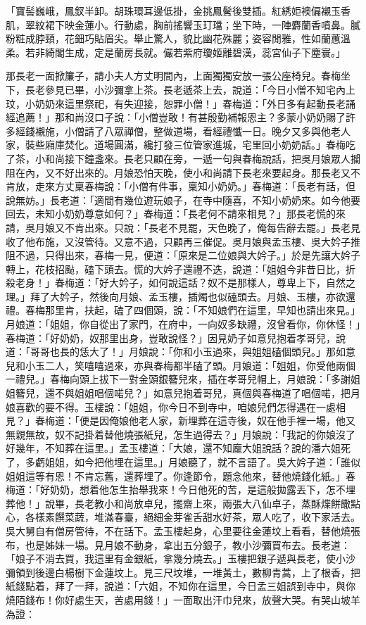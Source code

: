 「寶髻巍峨，鳳釵半卸。胡珠環耳邊低掛，金挑鳳鬢後雙插。紅綉姖襖偏襯玉香肌，翠紋裙下映金蓮小。行動處，胸前搖響玉玎璫；坐下時，一陣麝蘭香噴鼻。膩粉粧成脖頸，花鈿巧貼眉尖。舉止驚人，貌比幽花殊麗；姿容閒雅，性如蘭蕙溫柔。若非綺閣生成，定是蘭房長就。儼若紫府瓊姬離碧漢，蕊宮仙子下塵寰。」

那長老一面掀簾子，請小夫人方丈明間內，上面獨獨安放一張公座椅兒。春梅坐下，長老參見已畢，小沙彌拿上茶。長老遞茶上去，說道：「今日小僧不知宅內上玟，小奶奶來這里祭祀，有失迎接，恕罪小僧！」春梅道：「外日多有起動長老誦經追薦！」那和尚沒口子說：「小僧豈敢！有甚殷勤補報恩主？多蒙小奶奶賜了許多經錢襯施，小僧請了八眾禪僧，整做道場，看經禮懺一日。晚夕又多與他老人家，裝些廂庫焚化。道場圓滿，纔打發三位管家進城，宅里回小奶奶話。」春梅吃了茶，小和尚接下鐘盞來。長老只顧在旁，一遞一句與春梅說話，把吳月娘眾人攔阻在內，又不好出來的。月娘恐怕天晚，使小和尚請下長老來要起身。那長老又不肯放，走來方丈稟春梅說：「小僧有件事，稟知小奶奶。」春梅道：「長老有話，但說無妨。」長老道：「適間有幾位遊玩娘子，在寺中隨喜，不知小奶奶來。如今他要回去，未知小奶奶尊意如何？」春梅道：「長老何不請來相見？」那長老慌的來請，吳月娘又不肯出來。只說：「長老不見罷，天色晚了，俺每告辭去罷。」長老見收了他布施，又沒管待。又意不過，只顧再三催促。吳月娘與孟玉樓、吳大妗子推阻不過，只得出來，春梅一見，便道：「原來是二位娘與大妗子。」於是先讓大妗子轉上，花枝招颭，磕下頭去。慌的大妗子還禮不迭，說道：「姐姐今非昔日比，折殺老身！」春梅道：「好大妗子，如何說這話？奴不是那樣人，尊卑上下，自然之理。」拜了大妗子，然後向月娘、孟玉樓，插燭也似磕頭去。月娘、玉樓，亦欲還禮。春梅那里肯，扶起，磕了四個頭，說：「不知娘們在這里，早知也請出來見。」月娘道：「姐姐，你自從出了家門，在府中，一向奴多缺禮，沒曾看你，你休怪！」春梅道：「好奶奶，奴那里出身，豈敢說怪？」因見奶子如意兒抱着孝哥兒，說道：「哥哥也長的恁大了！」月娘說：「你和小玉過來，與姐姐磕個頭兒。」那如意兒和小玉二人，笑嘻嘻過來，亦與春梅都半磕了頭。月娘道：「姐姐，你受他兩個一禮兒。」春梅向頭上拔下一對金頭銀簪兒來，插在孝哥兒帽上，月娘說：「多謝姐姐簪兒，還不與姐姐唱個喏兒？」如意兒抱着哥兒，真個與春梅道了唱個喏，把月娘喜歡的要不得。玉樓說：「姐姐，你今日不到寺中，咱娘兒們怎得遇在一處相見？」春梅道：「便是因俺娘他老人家，新埋葬在這寺後，奴在他手裡一場，他又無親無故，奴不記掛着替他燒張紙兒，怎生過得去？」月娘說：「我記的你娘沒了好幾年，不知葬在這里。」孟玉樓道：「大娘，還不知龐大姐說話？說的潘六姐死了，多虧姐姐，如今把他埋在這里。」月娘聽了，就不言語了。吳大妗子道：「誰似姐姐這等有恩！不肯忘舊，還葬埋了。你逢節令，題念他來，替他燒錢化紙。」春梅道：「好奶奶，想着他怎生抬舉我來！今日他死的苦，是這般拋露丟下，怎不埋葬他！」說畢，長老教小和尚放卓兒，擺齋上來，兩張大八仙卓子，蒸酥煠餅饊點心，各樣素饌菜蔬，堆滿春臺，絕細金芽雀舌甜水好茶，眾人吃了，收下家活去。吳大舅自有僧房管待，不在話下。孟玉樓起身，心里要往金蓮坟上看看，替他燒張布，也是姊妹一場。見月娘不動身，拿出五分銀子，教小沙彌買布去。長老道：「娘子不消去買，我這里有金銀紙，拿幾分燒去。」玉樓把銀子遞與長老，使小沙彌領到後邊白楊樹下金蓮坟上。見三尺坟堆，一堆黃土，數柳青蒿，上了根香，把紙錢點着，拜了一拜，說道：「六姐，不知你在這里，今日孟三姐誤到寺中，與你燒陌錢布！你好處生天，苦處用錢！」一面取出汗巾兒來，放聲大哭。有哭山坡羊為證：

